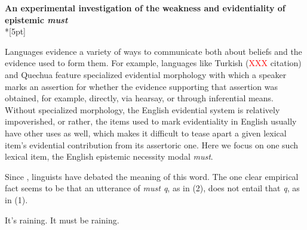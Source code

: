 \documentclass[11pt]{article}
\newcommand{\red}[1]{\textcolor{Red}{#1}}
\begin{document}
\begin{center}\textbf{An experimental investigation of the weakness and evidentiality of epistemic \emph{must}}\\*[5pt]
\end{center}

\vspace{-11pt}


Languages evidence a variety of ways to communicate both about beliefs and the evidence used to form them. For example, languages like Turkish (\red{XXX} citation) and Quechua \cite{faller2002} feature specialized evidential morphology with which a speaker marks an assertion for whether the evidence supporting that assertion was obtained, for example, directly, via hearsay, or through inferential means. Without specialized morphology, the English evidential system is relatively impoverished, or rather, the items used to mark evidentiality in English usually have other uses as well, which makes it difficult to tease apart a given lexical item's evidential contribution from its assertoric one. Here we focus on one such lexical item, the English epistemic necessity modal \emph{must}.

Since , linguists have debated the meaning of this word. The one clear empirical fact seems to be that an utterance of \emph{must q}, as in (2), does not entail that \emph{q}, as in (1). 


\vspace{-8pt}
\begin{exe}
\ex\label{inference} 
\begin{xlist}
\ex\label{bare}  It's raining.
\ex\label{must} It must be raining.
\end{xlist}
\end{exe}
\vspace{-8pt}
\end{document}
